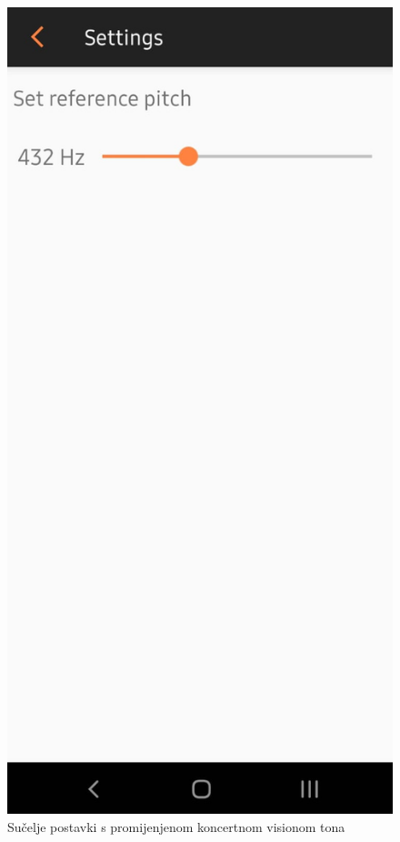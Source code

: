 \documentclass[times, utf8, zavrsni, numeric]{fer}
\begin{document}
\begin{figure}
	\centerline{\includegraphics[height=0.9\textheight]{zrtuner_options_432.jpeg}}
	\caption{Sučelje postavki s promijenjenom koncertnom visionom tona}
	\label{fig}
\end{figure}
\end{document}
